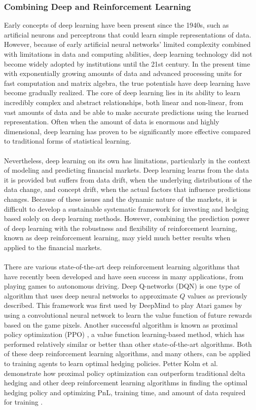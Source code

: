 \subsubsection{Combining Deep and Reinforcement Learning}
Early concepts of deep learning have been present since the 1940s, such as artificial neurons and perceptrons that could learn simple representations of data. However, because of early artificial neural networks' limited complexity combined with limitations in data and computing abilities, deep learning technology did not become widely adopted by institutions until the 21st century. In the present time with exponentially growing amounts of data and advanced processing units for fast computation and matrix algebra, the true potentials have deep learning have become gradually realized. The core of deep learning lies in its ability to learn incredibly complex and abstract relationships, both linear and non-linear, from vast amounts of data and be able to make accurate predictions using the learned representation. Often when the amount of data is enormous and highly dimensional, deep learning has proven to be significantly more effective compared to traditional forms of statistical learning.
\\ \\
Nevertheless, deep learning on its own has limitations, particularly in the context of modeling and predicting financial markets. Deep learning learns from the data it is provided but suffers from data drift, when the underlying distributions of the data change, and concept drift, when the actual factors that influence predictions changes. Because of these issues and the dynamic nature of the markets, it is difficult to develop a sustainable systematic framework for investing and hedging based solely on deep learning methods. However, combining the prediction power of deep learning with the robustness and flexibility of reinforcement learning, known as deep reinforcement learning, may yield much better results when applied to the financial markets. 
\\ \\
There are various state-of-the-art deep reinforcement learning algorithms that have recently been developed and have seen success in many applications, from playing games to autonomous driving. Deep Q-networks (DQN) is one type of algorithm that uses deep neural networks to approximate $Q$ values as previously described. This framework was first used by DeepMind \cite{dqn} to play Atari games by using a convolutional neural network to learn the value function of future rewards based on the game pixels. Another successful algorithm is known as proximal policy optimization (PPO) \cite{ppo}, a value function learning-based method, which has performed relatively similar or better than other state-of-the-art algorithms. Both of these deep reinforcement learning algorithms, and many others, can be applied to training agents to learn optimal hedging policies. Petter Kolm et al. demonstrate how proximal policy optimization can outperform traditional delta hedging and other deep reinforcement learning algorithms in finding the optimal hedging policy and optimizing PnL, training time, and amount of data required for training \cite{drl-ppo}.

